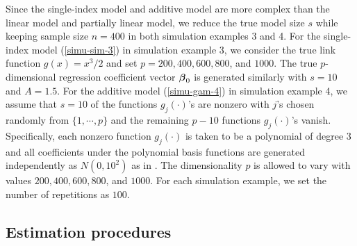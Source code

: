 \documentclass[11pt]{article}
\newcommand{\bbeta}{\mbox{\boldmath $\beta$}}
\begin{document}
Since the single-index model and additive model are more complex than the linear model and partially linear model, we reduce the true model size $s$ while keeping sample size $n= 400$ in both simulation examples 3 and 4. For the single-index model (\ref{simu-sim-3}) in simulation example 3, we consider
the true link function $g(x) = x^3 / 2 $ and set $p = 200, 400, 600, 800$, and $1000$.
The true $p$-dimensional regression coefficient vector $\bbeta_0$ is generated similarly with $s = 10$ and $A = 1.5$. For the additive model (\ref{simu-gam-4}) in simulation example 4, we assume that $s = 10$ of the functions $g_j(\cdot)$'s are nonzero with $j$'s chosen randomly from $\{1, \cdots, p\}$ and the remaining $p - 10$ functions $g_j(\cdot)$'s vanish. Specifically, each nonzero function $g_j(\cdot)$ is taken to be a polynomial of degree 3 and all coefficients under the polynomial basis functions are generated independently %
as $N(0, 10^2)$ as in \cite{Chouldechova2015}.
The dimensionality $p$ is allowed to vary with values $200, 400, 600, 800$, and $1000$. For each simulation example, we set the number of repetitions as $100$.

\subsection{Estimation procedures} \label{sec4.2}
\end{document}
